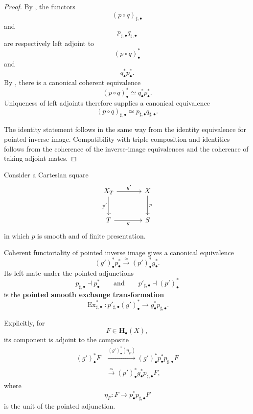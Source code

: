 \begin{proof}
By
,
the functors
\[
    (p\circ q)_{\sharp,\bullet}
\]
and
\[
    p_{\sharp,\bullet}q_{\sharp,\bullet}
\]
are respectively left adjoint to
\[
    (p\circ q)^*_\bullet
\]
and
\[
    q^*_\bullet p^*_\bullet.
\]
By
,
there is a canonical coherent equivalence
\[
    (p\circ q)^*_\bullet
    \simeq
    q^*_\bullet p^*_\bullet.
\]
Uniqueness of left adjoints therefore supplies a canonical equivalence
\[
    (p\circ q)_{\sharp,\bullet}
    \simeq
    p_{\sharp,\bullet}q_{\sharp,\bullet}.
\]

The identity statement follows in the same way from the identity
equivalence for pointed inverse image. Compatibility with triple
composition and identities follows from the coherence of the
inverse-image equivalences and the coherence of taking adjoint mates.
\end{proof}

\begin{construction}
\label{con:pointed-unstable-smooth-exchange-transformation}
Consider a Cartesian square
\[
\begin{tikzcd}[column sep=large, row sep=large]
    X_T
        \arrow[r, "g'"]
        \arrow[d, "p'"']
    &
    X
        \arrow[d, "p"]
    \\
    T
        \arrow[r, "g"']
    &
    S
\end{tikzcd}
\]
in which \(p\) is smooth and of finite presentation.

Coherent functoriality of pointed inverse image gives a canonical
equivalence
\[
    (g')^*_\bullet p^*_\bullet
    \xrightarrow{\simeq}
    (p')^*_\bullet g^*_\bullet.
\]
Its left mate under the pointed adjunctions
\[
    p_{\sharp,\bullet}
    \dashv
    p^*_\bullet
    \qquad\text{and}\qquad
    p'_{\sharp,\bullet}
    \dashv
    (p')^*_\bullet
\]
is the \textbf{pointed smooth exchange transformation}
\[
    \operatorname{Ex}_{\sharp,\bullet}^{*}
    \colon
    p'_{\sharp,\bullet}(g')^*_\bullet
    \longrightarrow
    g^*_\bullet p_{\sharp,\bullet}.
\]

Explicitly, for
\[
    F
    \in
    \mathbf H_\bullet(X),
\]
its component is adjoint to the composite
\[
\begin{aligned}
    (g')^*_\bullet F
    &\xrightarrow{(g')^*_\bullet(\eta_F)}
    (g')^*_\bullet
    p^*_\bullet
    p_{\sharp,\bullet}F
    \\
    &\xrightarrow{\simeq}
    (p')^*_\bullet
    g^*_\bullet
    p_{\sharp,\bullet}F,
\end{aligned}
\]
where
\[
    \eta_F
    \colon
    F
    \longrightarrow
    p^*_\bullet p_{\sharp,\bullet}F
\]
is the unit of the pointed adjunction.
\end{construction}

